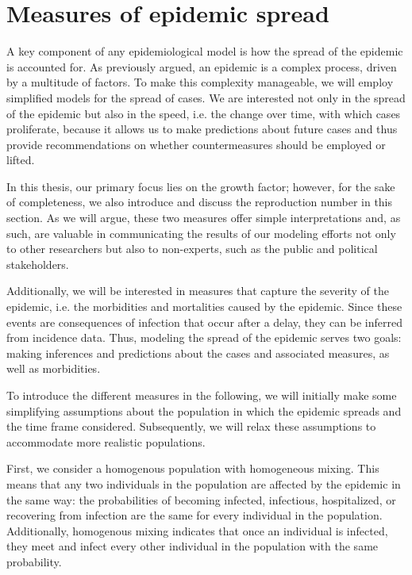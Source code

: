 \section{Measures of epidemic spread}
\label{sec:measures_of_epidemic_spread}
A key component of any epidemiological model is how the spread of the epidemic is accounted for. As previously argued, an epidemic is a complex process, driven by a multitude of factors. To make this complexity manageable, we will employ simplified models for the spread of cases. We are interested not only in the spread of the epidemic but also in the speed, i.e. the change over time, with which cases proliferate, because it allows us to make predictions about future cases and thus provide recommendations on whether countermeasures should be employed or lifted.

In this thesis, our primary focus lies on the growth factor; however, for the sake of completeness, we also introduce and discuss the reproduction number in this section. As we will argue, these two measures offer simple interpretations and, as such, are valuable in communicating the results of our modeling efforts not only to other researchers but also to non-experts, such as the public and political stakeholders.

Additionally, we will be interested in measures that capture the severity of the epidemic, i.e. the morbidities and mortalities caused by the epidemic. Since these events are consequences of infection that occur after a delay, they can be inferred from incidence data. Thus, modeling the spread of the epidemic serves two goals: making inferences and predictions about the cases and associated measures, as well as morbidities.

To introduce the different measures in the following, we will initially make some simplifying assumptions about the population in which the epidemic spreads and the time frame considered. Subsequently, we will relax these assumptions to accommodate more realistic populations. 

First, we consider a homogenous population with homogeneous mixing. This means that any two individuals in the population are affected by the epidemic in the same way: the probabilities of becoming infected, infectious, hospitalized, or recovering from infection are the same for every individual in the population. Additionally, homogenous mixing indicates that once an individual is infected, they meet and infect every other individual in the population with the same probability. 

